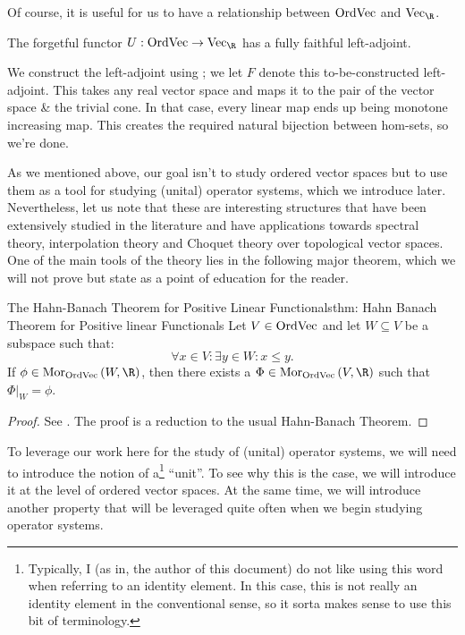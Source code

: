 \documentclass[main.tex]{subfiles}
\begin{document}
Of course, it is useful for us to have a relationship between $\text{OrdVec}$ and $\Vect{\R}$. 

\begin{exercise}\label{ex: forgetful functor from OrdVec to Vec has a left adjoint}The forgetful functor $U: \OrdVect \to \Vect{\R}$ has a fully faithful left-adjoint. 
\end{exercise}
\begin{solution}\label{sol: forgetful functor from OrdVec to Vec has a left adjoint}We construct the left-adjoint using ; we let $F$ denote this to-be-constructed left-adjoint. This takes any real vector space and maps it to the pair of the vector space \& the trivial cone. In that case, every linear map ends up being monotone increasing map. This creates the required natural bijection between hom-sets, so we're done. 
\end{solution}

As we mentioned above, our goal isn't to study ordered vector spaces but to use them as a tool for studying (unital) operator systems, which we introduce later. Nevertheless, let us note that these are interesting structures that have been extensively studied in the literature and have applications towards spectral theory, interpolation theory and Choquet theory over topological vector spaces. One of the main tools of the theory lies in the following major theorem, which we will not prove but state as a point of education for the reader.

\begin{theorem}{The Hahn-Banach Theorem for Positive Linear Functionals}{thm: Hahn Banach Theorem for Positive linear Functionals}
Let $V \in \text{OrdVec}$ and let $W \subseteq V$ be a subspace such that:
\[\forall x \in V: \exists y \in W: x \leq y.\]
If $\phi \in \Mor{\OrdVect}{W}{\R}$, then there exists a $\Phi \in \Mor{\OrdVect}{V}{\R}$ such that $\Phi|_W = \phi$. 
\end{theorem}
\begin{proof}
See \cite[Theorem 2.3.7, p.68-69]{Salamon}. The proof is a reduction to the usual Hahn-Banach Theorem.
\end{proof}

To leverage our work here for the study of (unital) operator systems, we will need to introduce the notion of a\footnote{Typically, I (as in, the author of this document) do not like using this word when referring to an identity element. In this case, this is not really an identity element in the conventional sense, so it sorta makes sense to use this bit of terminology.} ``unit''. To see why this is the case, we will introduce it at the level of ordered vector spaces. At the same time, we will introduce another property that will be leveraged quite often when we begin studying operator systems. 
\end{document}
